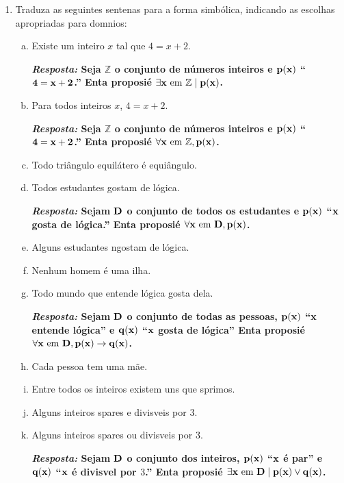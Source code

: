 \begin{enumerate}[{\bf 1.}]
\item Traduza as seguintes senten\cc as para a forma simb\'olica, indicando as escolhas apropriadas para dom\ih nios:
\begin{enumerate}[a)]
\item Existe um inteiro $x$ tal que $4=x+2$.

{\bf{\it Resposta:} Seja $\mathbb{Z}$ o conjunto de n\'umeros inteiros e ${\bf p(x)}$ ``${\bf 4=x+2}$.'' Ent\ao a proposi\cao \'e ${\bf \exists x \textrm{ em } \mathbb{Z} \mid  p(x)}$.}

\item Para todos inteiros $x$, $4=x+2$.

{\bf{\it Resposta:} Seja $\mathbb{Z}$ o conjunto de n\'umeros inteiros e ${\bf p(x)}$ ``${\bf 4=x+2}$.'' Ent\ao a proposi\cao \'e ${\bf \forall x \textrm{ em } \mathbb{Z}, p(x)}$.}

\item Todo tri\^angulo equil\'atero \'e equi\^angulo.
\item Todos estudantes gostam de l\'ogica.

{\bf{\it Resposta:} Sejam ${\bf D}$ o conjunto de todos os estudantes e ${\bf p(x})$ ``${\bf x}$ gosta de l\'ogica.'' Ent\ao a proposi\cao \'e ${\bf \forall x \textrm{ em } D, p(x)}$.}

\item Alguns estudantes n\ao gostam de l\'ogica.
\item Nenhum homem \'e uma ilha.
\item Todo mundo que entende l\'ogica gosta dela.

{\bf{\it Resposta:} Sejam ${\bf D}$ o conjunto de todas as pessoas, ${\bf p(x)}$ ``${\bf x}$ entende l\'ogica'' e ${\bf q(x)}$ ``${\bf x}$ gosta de l\'ogica'' Ent\ao a proposi\cao \'e ${\bf \forall x \textrm{ em } D, p(x)\to q(x)}$.}

\item Cada pessoa tem uma m\~ae.
\item Entre todos os inteiros existem uns que s\ao primos.
\item Alguns inteiros s\ao pares e divis\ih veis por 3.
\item Alguns inteiros s\ao pares ou divis\ih veis por 3. 

{\bf{\it Resposta:} Sejam ${\bf D}$ o conjunto dos inteiros, ${\bf p(x)}$ ``${\bf x}$ \'e par'' e ${\bf q(x)}$ ``${\bf x}$ \'e divis\ih vel por $3$.'' Ent\ao a proposi\cao \'e ${\bf \exists x \textrm{ em } D \mid  p(x)\vee q(x)}$.}


\end{enumerate}
\end{enumerate}
